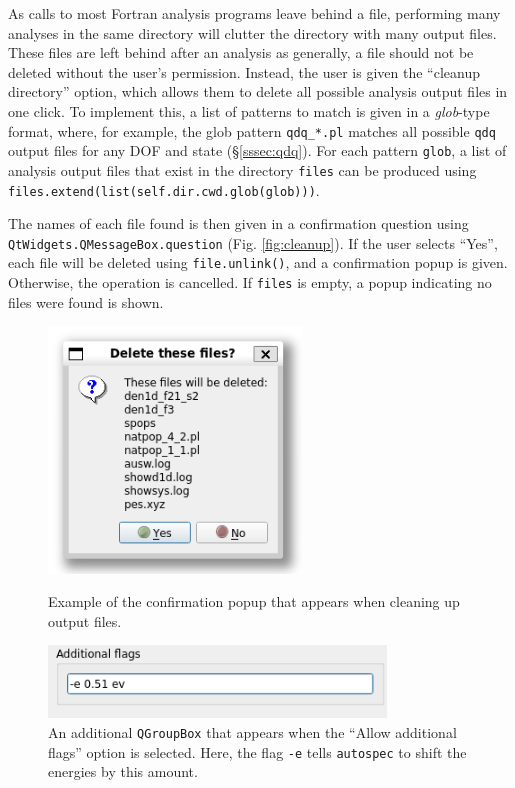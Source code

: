\documentclass[12pt]{article}
\begin{document}
As calls to most Fortran analysis programs leave behind a file, performing many analyses in the same directory will clutter the directory with many output files. These files are left behind after an analysis as generally, a file should not be deleted without the user's permission. Instead, the user is given the ``cleanup directory'' option, which allows them to delete all possible analysis output files in one click. To implement this, a list of patterns to match is given in a \textit{glob}-type format, where, for example, the glob pattern \texttt{qdq\_*.pl} matches all possible \texttt{qdq} output files for any DOF and state (\S\ref{sssec:qdq}). For each pattern \texttt{glob}, a list of analysis output files that exist in the directory \texttt{files} can be produced using \texttt{files.extend(list(self.dir.cwd.glob(glob)))}.

The names of each file found is then given in a confirmation question using \texttt{QtWidgets.QMessageBox.question} (Fig. \ref{fig:cleanup}). If the user selects ``Yes'', each file will be deleted using \texttt{file.unlink()}, and a confirmation popup is given. Otherwise, the operation is cancelled. If \texttt{files} is empty, a popup indicating no files were found is shown.

\begin{figure}[h]
    \centering
    \begin{minipage}[t]{.47\textwidth}
        \centering
        \includegraphics[width=0.6\textwidth]{img/cleanup.png}
        \caption{Example of the confirmation popup that appears when cleaning up output files.}
        \label{fig:cleanup}
    \end{minipage}\hfill\begin{minipage}[t]{.47\textwidth}
        \centering
        \includegraphics[width=0.8\textwidth]{img/add_flags.png}
        \caption{An additional \texttt{QGroupBox} that appears when the ``Allow additional flags'' option is selected. Here, the flag \texttt{-e} tells \texttt{autospec} to shift the energies by this amount.}
        \label{fig:add_flags}
    \end{minipage}
\end{figure}
\end{document}

